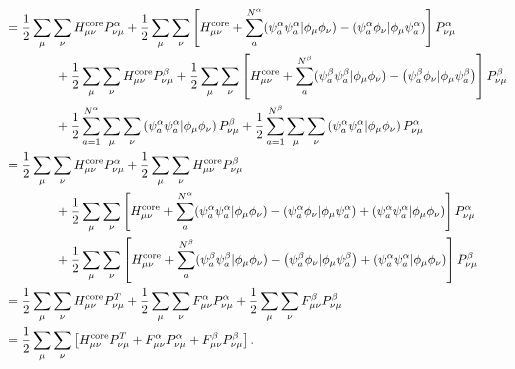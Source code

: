 \documentclass[a4paper]{book}
\newcounter{solution}[chapter]
\newcommand{\core}{{\rm core}}
\begin{document}
\begin{solution}
\begin{align*}
		&= \frac{1}{2} \sum_\mu \sum_\nu H^\core_{\mu \nu} P^\alpha_{\nu \mu} + \frac{1}{2} \sum_\mu \sum_\nu \left[ H^\core_{\mu \nu} + \sum_a^{N^\alpha} ( \psi^\alpha_a \psi^\alpha_a | \phi_\mu \phi_\nu ) - \left( \psi^\alpha_a \phi_\nu | \phi_\mu \psi^\alpha_a \right) \right] P^\alpha_{\nu \mu} \\
		&\hspace{4em} + \frac{1}{2} \sum_\mu \sum_\nu H^\core_{\mu \nu} P^\beta_{\nu \mu} + \frac{1}{2} \sum_\mu \sum_\nu \left[ H^\core_{\mu \nu} + \sum_a^{N^\beta} ( \psi^\beta_a \psi^\beta_a | \phi_\mu \phi_\nu ) - \left( \psi^\beta_a \phi_\nu | \phi_\mu \psi^\beta_a \right) \right] P^\beta_{\nu \mu} \\
		&\hspace{4em} + \frac{1}{2} \sum_{ a=1 }^{N^\alpha} \sum_\mu \sum_\nu \left( \psi^\alpha_a \psi^\alpha_a | \phi_\mu \phi_\nu \right) P^\beta_{\nu \mu} + \frac{1}{2} \sum_{ a=1 }^{N^\beta} \sum_\mu \sum_\nu \left( \psi^\alpha_a \psi^\alpha_a | \phi_\mu \phi_\nu \right) P^\alpha_{\nu \mu} \\
		&= \frac{1}{2} \sum_\mu \sum_\nu H^\core_{\mu \nu} P^\alpha_{\nu \mu} + \frac{1}{2} \sum_\mu \sum_\nu H^\core_{\mu \nu} P^\beta_{\nu \mu} \\
		&\hspace{4em} + \frac{1}{2} \sum_\mu \sum_\nu \left[ H^\core_{\mu \nu} + \sum_a^{N^\alpha} ( \psi^\alpha_a \psi^\alpha_a | \phi_\mu \phi_\nu ) - \left( \psi^\alpha_a \phi_\nu | \phi_\mu \psi^\alpha_a \right) + \left( \psi^\alpha_a \psi^\alpha_a | \phi_\mu \phi_\nu \right) \right] P^\alpha_{\nu \mu} \\
		&\hspace{4em} + \frac{1}{2} \sum_\mu \sum_\nu \left[ H^\core_{\mu \nu} + \sum_a^{N^\beta} ( \psi^\beta_a \psi^\beta_a | \phi_\mu \phi_\nu ) - \left( \psi^\beta_a \phi_\nu | \phi_\mu \psi^\beta_a \right) + \left( \psi^\alpha_a \psi^\alpha_a | \phi_\mu \phi_\nu \right) \right] P^\beta_{\nu \mu} \\
		&= \frac{1}{2} \sum_\mu \sum_\nu H^\core_{\mu \nu} P^T_{\nu \mu} + \frac{1}{2} \sum_\mu \sum_\nu F^\alpha_{\mu \nu} P^\alpha_{\nu \mu} + \frac{1}{2} \sum_\mu \sum_\nu F^\beta_{\mu \nu} P^\beta_{\nu \mu} \\
		&= \frac{1}{2} \sum_\mu \sum_\nu \left[ H^\core_{\mu \nu} P^T_{\nu \mu} + F^\alpha_{\mu \nu} P^\alpha_{\nu \mu} + F^\beta_{\mu \nu} P^\beta_{\nu \mu} \right] .
	\end{align*}		
	
	\end{solution}
	
\end{document}

